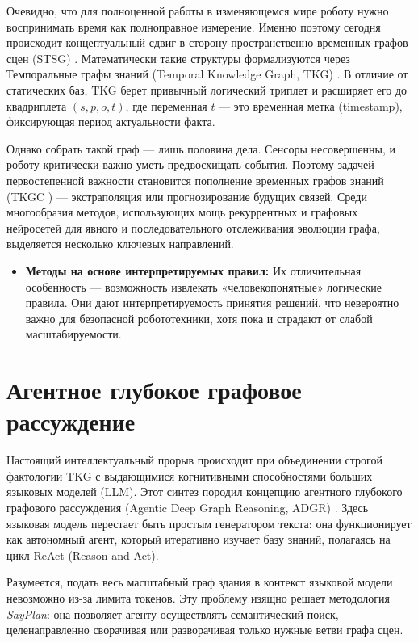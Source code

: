 Очевидно, что для полноценной работы в изменяющемся мире роботу нужно воспринимать время как полноправное измерение. Именно поэтому сегодня происходит концептуальный сдвиг в сторону пространственно-временных графов сцен (STSG) \cite{ref20}. Математически такие структуры формализуются через Темпоральные графы знаний (Temporal Knowledge Graph, TKG) \cite{ref40}. В отличие от статических баз, TKG берет привычный логический триплет и расширяет его до квадриплета $\displaystyle (s, p, o, t)$, где переменная $\displaystyle t$ — это временная метка (timestamp), фиксирующая период актуальности факта.

Однако собрать такой граф — лишь половина дела. Сенсоры несовершенны, и роботу критически важно уметь предвосхищать события. Поэтому задачей первостепенной важности становится пополнение временных графов знаний (TKGC \cite{ref74}) — экстраполяция или прогнозирование будущих связей. Среди многообразия методов, использующих мощь рекуррентных и графовых нейросетей для явного и последовательного отслеживания эволюции графа, выделяется несколько ключевых направлений.
\begin{itemize}
    \item \textbf{Методы на основе интерпретируемых правил:} \cite{ref71} Их отличительная особенность — возможность извлекать «человекопонятные» логические правила. Они дают интерпретируемость принятия решений, что невероятно важно для безопасной робототехники, хотя пока и страдают от слабой масштабируемости.
\end{itemize}

\section{Агентное глубокое графовое рассуждение}

Настоящий интеллектуальный прорыв происходит при объединении строгой фактологии TKG с выдающимися когнитивными способностями больших языковых моделей (LLM). Этот синтез породил концепцию агентного глубокого графового рассуждения (Agentic Deep Graph Reasoning, ADGR) \cite{ref19}. Здесь языковая модель перестает быть простым генератором текста: она функционирует как автономный агент, который итеративно изучает базу знаний, полагаясь на цикл ReAct (Reason and Act).

Разумеется, подать весь масштабный граф здания в контекст языковой модели невозможно из-за лимита токенов. Эту проблему изящно решает методология \textit{SayPlan}: она позволяет агенту осуществлять семантический поиск, целенаправленно сворачивая или разворачивая только нужные ветви графа сцен. 

